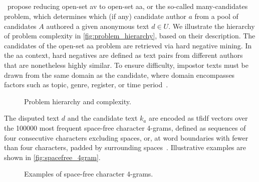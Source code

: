 \subsection{\impApprTitle{}}
\label{sec:impostor_method_theory}

\citet{koppel_determining_2014}\ propose reducing open-set \ac{av} to open-set \ac{aa}, or the so-called many-candidates problem, which determines which (if any) candidate author $a$ from a pool of candidates $A$ authored a given anonymous text $d \in U$. 
We illustrate the hierarchy of problem complexity in \autoref{fig:problem_hierarchy}, based on their description.
The candidates of the open-set \ac{aa} problem are retrieved via hard negative mining. 
In the \ac{aa} context, hard negatives are defined as text pairs from different authors that are nonetheless highly similar. 
To ensure difficulty, impostor texts must be drawn from the same domain as the candidate, where domain encompasses factors such as topic, genre, register, or time period~\citep{bischoff_importance_2020}. 

\begin{figure}[htbp]
    \centering
    
    \caption{Problem hierarchy and complexity.}
    \label{fig:problem_hierarchy}
\end{figure}

The disputed text $d$ and the candidate text $k_a$ are encoded as \ac{tfidf} vectors over the \num{100000} most frequent space-free character 4-grams, defined as sequences of four consecutive characters excluding spaces, or, at word boundaries with fewer than four characters, padded by surrounding spaces~\citep{koppel_authorship_2011,neal_surveying_2018}. 
Illustrative examples are shown in \autoref{fig:spacefree_4gram}.

\begin{figure}[ht]
    \centering
    \caption{Examples of space-free character 4-grams.}
    \label{fig:spacefree_4gram}
\end{figure}


